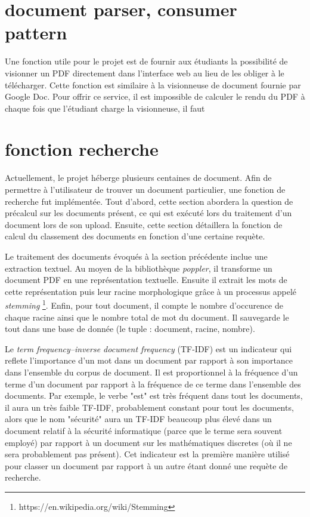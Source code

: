 \documentclass[a4paper,12pt]{article}
\begin{document}
\section{document parser, consumer pattern}

Une fonction utile pour le projet est de fournir aux étudiants la possibilité
de visionner un PDF directement dans l'interface web au lieu de les obliger
à le télécharger. Cette fonction est similaire à la visionneuse de document fournie
par Google Doc. Pour offrir ce service, il est impossible de calculer le rendu du PDF
à chaque fois que l'étudiant charge la visionneuse, il faut 


\section{fonction recherche}

Actuellement, le projet héberge plusieurs centaines de document.
Afin de permettre à l'utilisateur de trouver un document particulier, une
fonction de recherche fut implémentée. Tout d'abord, cette section abordera
la question de précalcul sur les documents présent, ce qui est exécuté lors
du traitement d'un document lors de son upload. Ensuite, cette section
détaillera la fonction de calcul du classement des documents en fonction
d'une certaine requète.

Le traitement des documents évoqués à la section précédente inclue une extraction
textuel. Au moyen de la bibliothèque \textit{poppler}, il transforme un document
PDF en une représentation textuelle. Ensuite il extrait les mots de cette représentation
puis leur racine morphologique grâce à un processus appelé \textit{stemming}
\footnote{https://en.wikipedia.org/wiki/Stemming}. Enfin, pour tout document,
il compte le nombre d'occurence de chaque racine ainsi que le nombre total de mot du document.
Il sauvegarde le tout dans une base de donnée (le tuple : document, racine, nombre).

Le \textit{term frequency–inverse document frequency} (TF-IDF) est un indicateur
qui reflete l'importance d'un mot dans un document par rapport à son importance
dans l'ensemble du corpus de document. Il est proportionnel à la fréquence d'un terme
d'un document par rapport à la fréquence de ce terme dans l'ensemble des documents.
Par exemple, le verbe "est" est très fréquent dans tout les documents, il aura
un très faible TF-IDF, probablement constant pour tout les documents,
alors que le nom "sécurité" aura un TF-IDF beaucoup plus élevé dans un document
relatif à la sécurité informatique (parce que le terme sera souvent employé)
par rapport à un document sur les mathématiques discretes (où il ne sera probablement
pas présent). Cet indicateur est la première manière utilisé pour classer
un document par rapport à un autre étant donné une requète de recherche.
\end{document}
